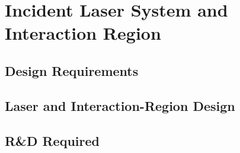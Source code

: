\section{Incident Laser System and Interaction Region}

\subsection{Design Requirements}

\subsection{Laser and Interaction-Region Design}

\subsection{R\&D Required}

\blankline
\blankline
